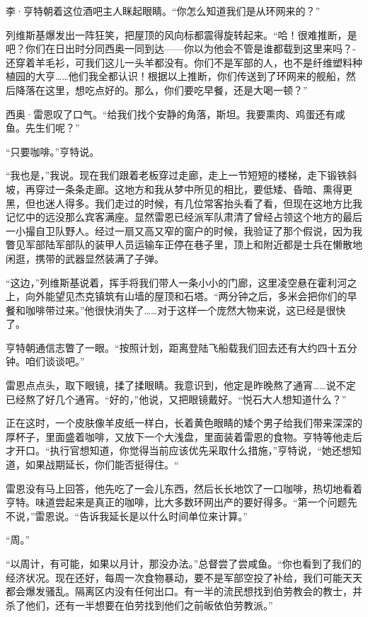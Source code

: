 \documentclass[AutoFakeBold=true]{book}
\begin{document}
李·亨特朝着这位酒吧主人眯起眼睛。``你怎么知道我们是从环网来的？''

列维斯基爆发出一阵狂笑，把屋顶的风向标都震得旋转起来。``哈！很难推断，是吧？你们在日出时分同西奥一同到达——你以为他会不管是谁都载到这里来吗？-还穿着羊毛衫，可我们这儿一头羊都没有。你们不是军部的人，也不是纤维塑料种植园的大亨……他们我全都认识！根据以上推断，你们传送到了环网来的舰船，然后降落在这里，想吃点好的。那么，你们要吃早餐，还是大喝一顿？''

西奥·雷恩叹了口气。``给我们找个安静的角落，斯坦。我要熏肉、鸡蛋还有咸鱼。先生们呢？''

``只要咖啡。''亨特说。

``我也是，''我说。现在我们跟着老板穿过走廊，走上一节短短的楼梯，走下锻铁斜坡，再穿过一条条走廊。这地方和我从梦中所见的相比，要低矮、昏暗、熏得更黑，但也迷人得多。我们走过的时候，有几位常客抬头看了看，但现在这地方比我记忆中的远没那么宾客满座。显然雷恩已经派军队肃清了曾经占领这个地方的最后一小撮自卫队野人。经过一扇又高又窄的窗户的时候，我验证了那个假说，因为我瞥见军部陆军部队的装甲人员运输车正停在巷子里，顶上和附近都是士兵在懒散地闲逛，携带的武器显然装满了子弹。

``这边，''列维斯基说着，挥手将我们带人一条小小的门廊，这里凌空悬在霍利河之上，向外能望见杰克镇筑有山墙的屋顶和石塔。``两分钟之后，多米会把你们的早餐和咖啡带过来。''他很快消失了……对于这样一个庞然大物来说，这已经是很快了。

亨特朝通信志瞥了一眼。``按照计划，距离登陆飞船载我们回去还有大约四十五分钟。咱们谈谈吧。''

雷恩点点头，取下眼镜，揉了揉眼睛。我意识到，他定是昨晚熬了通宵……说不定已经熬了好几个通宵。``好的，''他说，又把眼镜戴好。``悦石大人想知道什么？''

正在这时，一个皮肤像羊皮纸一样白，长着黄色眼睛的矮个男子给我们带来深深的厚杯子，里面盛着咖啡，又放下一个大浅盘，里面装着雷恩的食物。亨特等他走后才开口。``执行官想知道，你觉得当前应该优先采取什么措施，''亨特说，``她还想知道，如果战期延长，你们能否挺得住。``

雷恩没有马上回答，他先吃了一会儿东西，然后长长地饮了一口咖啡，热切地看着亨特。味道尝起来是真正的咖啡，比大多数环网出产的要好得多。``第一个问题先不说，''雷恩说。``告诉我延长是以什么时间单位来计算。''

``周。''

``以周计，有可能，如果以月计，那没办法。''总督尝了尝咸鱼。``你也看到了我们的经济状况。现在还好，每周一次食物暴动，要不是军部空投了补给，我们可能天天都会爆发骚乱。隔离区内没有任何出口。有一半的流民想找到伯劳教会的教士，并杀了他们，还有一半想要在伯劳找到他们之前皈依伯劳教派。''
\end{document}
